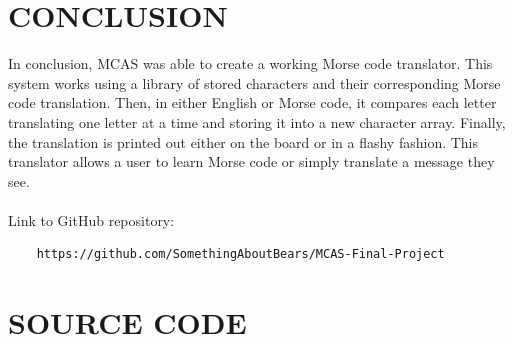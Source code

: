 \documentclass[12pt]{article}
\begin{document}
\section{CONCLUSION}
In conclusion, MCAS was able to create a working Morse code translator. This system works using a library of stored characters and their corresponding Morse code translation. Then, in either English or Morse code, it compares each letter translating one letter at a time and storing it into a new character array. Finally, the translation is printed out either on the board or in a flashy fashion. This translator allows a user to learn Morse code or simply translate a message they see. \\
\\
Link to GitHub repository: \begin{verbatim}
    https://github.com/SomethingAboutBears/MCAS-Final-Project
\end{verbatim}
\newpage



\newpage
\appendix

\section{SOURCE CODE}
\label{sourcecode}

\end{document}
